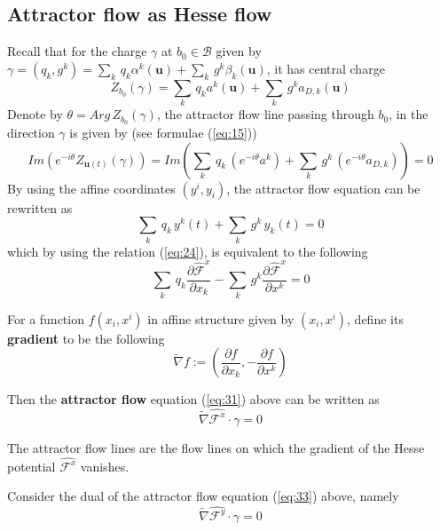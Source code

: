 \documentclass{article}
\begin{document}
\subsection{Attractor flow as Hesse flow}\label{sec:4.2}

Recall that for the charge $\gamma$ at $b_{0}\in\mathcal{B}$ given by $\gamma=(q_{k},g^{k})=\sum_{k}\,q_{k}\alpha^{k}(\mathbf{u})+\sum_{k}\,g^{k}\beta_{k}\left(\mathbf{u}\right)$, it has central charge\[Z_{b_{0}}(\gamma)=\sum_{k}\,q_{k}a^{k}(\mathbf{u})+\sum_{k}\,g^{k}a_{D,k}(\mathbf{u})\]
Denote by $\theta=Arg\,Z_{b_{0}}(\gamma)$, the attractor flow line passing through $b_{0}$, in the direction $\gamma$ is given by (see formulae (\ref{eq:15}))
\[Im\left(e^{-i\theta}Z_{\mathbf{u}(t)}(\gamma)\right)=Im\left(\sum_{k}\,q_{k}\,\left(e^{-i\theta}a^{k}\right)+\sum_{k}\,g^{k}\,\left(e^{-i\theta}a_{D,k}\right)\right)=0\] 
By using the affine coordinates $(y^{i},y_{i})$, the attractor flow equation can be rewritten as
\begin{equation}
    \sum_{k}\,q_{k}\,y^{k}(t)+\sum_{k}\,g^{k}\,y_{k}(t)=0
\end{equation}
which by using the relation (\ref{eq:24}), is equivalent to the following
\begin{equation}\label{eq:31}
    \sum_{k}\,q_{k}\frac{\partial\widehat{\mathscr{F}}^{x}}{\partial x_{k}}-\sum_{k}\,g^{k}\frac{\partial\widehat{\mathscr{F}}^{x}}{\partial x^{k}}=0
\end{equation}
\begin{definition}
For a function $f(x_{i},x^{i})$ in affine structure given by $(x_{i},x^{i})$, define its \textbf{gradient} to be the following
\begin{equation}
    \widetilde{\nabla}f:=\left(\frac{\partial f}{\partial x_{k}},-\frac{\partial f}{\partial x^{k}}\right)
\end{equation}
\end{definition}
Then the \textbf{attractor flow} equation (\ref{eq:31}) above can be written as
\begin{equation}\label{eq:33}
    \widetilde{\nabla}\widehat{\mathscr{F}^{x}}\cdot\gamma=0
\end{equation}
\begin{proposition}
The attractor flow lines are the flow lines on which the gradient of the Hesse potential $\widehat{\mathscr{F}^{x}}$ vanishes.
\end{proposition}

Consider the dual of the attractor flow equation (\ref{eq:33}) above, namely
\begin{equation}\label{eq:34}
     \widetilde{\nabla}\widehat{\mathscr{F}^{y}}\cdot\gamma=0
\end{equation}
\end{document}
